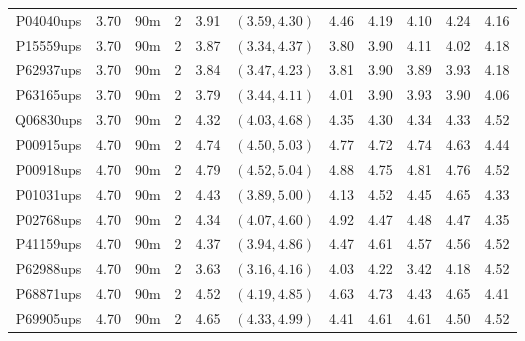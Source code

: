 \begin{landscape}
\begin{longtable}{cccc|cc|ccccc}
  P04040ups & 3.70 & 90m &   2 & 3.91 & $(3.59, 4.30)$ & 4.46 & 4.19 & 4.10 & 4.24 & 4.16 \\ 
  P15559ups & 3.70 & 90m &   2 & 3.87 & $(3.34, 4.37)$ & 3.80 & 3.90 & 4.11 & 4.02 & 4.18 \\ 
  P62937ups & 3.70 & 90m &   2 & 3.84 & $(3.47, 4.23)$ & 3.81 & 3.90 & 3.89 & 3.93 & 4.18 \\ 
  P63165ups & 3.70 & 90m &   2 & 3.79 & $(3.44, 4.11)$ & 4.01 & 3.90 & 3.93 & 3.90 & 4.06 \\ 
  Q06830ups & 3.70 & 90m &   2 & 4.32 & $(4.03, 4.68)$ & 4.35 & 4.30 & 4.34 & 4.33 & 4.52 \\ 
  P00915ups & 4.70 & 90m &   2 & 4.74 & $(4.50, 5.03)$ & 4.77 & 4.72 & 4.74 & 4.63 & 4.44 \\ 
  P00918ups & 4.70 & 90m &   2 & 4.79 & $(4.52, 5.04)$ & 4.88 & 4.75 & 4.81 & 4.76 & 4.52 \\ 
  P01031ups & 4.70 & 90m &   2 & 4.43 & $(3.89, 5.00)$ & 4.13 & 4.52 & 4.45 & 4.65 & 4.33 \\ 
  P02768ups & 4.70 & 90m &   2 & 4.34 & $(4.07, 4.60)$ & 4.92 & 4.47 & 4.48 & 4.47 & 4.35 \\ 
  P41159ups & 4.70 & 90m &   2 & 4.37 & $(3.94, 4.86)$ & 4.47 & 4.61 & 4.57 & 4.56 & 4.52 \\ 
  P62988ups & 4.70 & 90m &   2 & 3.63 & $(3.16, 4.16)$ & 4.03 & 4.22 & 3.42 & 4.18 & 4.52 \\ 
  P68871ups & 4.70 & 90m &   2 & 4.52 & $(4.19, 4.85)$ & 4.63 & 4.73 & 4.43 & 4.65 & 4.41 \\ 
  P69905ups & 4.70 & 90m &   2 & 4.65 & $(4.33, 4.99)$ & 4.41 & 4.61 & 4.61 & 4.50 & 4.52 \\ 
   \hline
\end{longtable}
\end{landscape}
\clearpage

